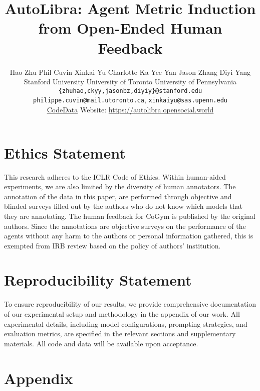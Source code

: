 \documentclass[11pt, a4paper]{googledeepmind}
\title{AutoLibra: Agent Metric Induction from Open-Ended Human Feedback}
\author{Hao Zhu\raisebox{0.5em}{\texttt{[image: figs/scale.png]}} Phil
Cuvin\raisebox{0.5em}{\texttt{[image: figs/microscope.png]}} Xinkai
Yu\raisebox{0.5em}{\texttt{[image: figs/ladder.png]}} Charlotte Ka Yee
Yan\raisebox{0.5em}{\texttt{[image: figs/scale.png]}} Jason Zhang\raisebox{0.5em}{\texttt{[image: figs/scale.png]}} Diyi Yang\raisebox{0.5em}{\texttt{[image: 
	figs/scale.png
]}}\\ \raisebox{0.5em}{\texttt{[image: figs/scale.png]}}Stanford
University \raisebox{0.5em}{\texttt{[image: figs/microscope.png]}}University
of Toronto \raisebox{0.5em}{\texttt{[image: figs/ladder.png]}}University
of Pennsylvania\\ \texttt{\{zhuhao,ckyy,jasonbz,diyiy\}@stanford.edu}\\ \texttt{philippe.cuvin@mail.utoronto.ca},
\texttt{xinkaiyu@sas.upenn.edu}\\ \href{https://github.com/Open-Social-World/autolibra}{Code}\quad\href{https://huggingface.co/datasets/open-social-world/autolibra}{Data}\quad
Website: \url{https://autolibra.opensocial.world}}
\begin{document}
	\maketitle
	\tableofcontents

	

	

	

	
	
	

	\section*{Ethics Statement}
	This research adheres to the ICLR Code of Ethics. Within human-aided experiments,
	we are also limited by the diversity of human annotators. The annotation of the
	data in this paper, are performed through objective and blinded surveys filled
	out by the authors who do not know which models that they are annotating. The human
	feedback for CoGym \citep{shao2024collaborative} is published by the original
	authors. Since the annotations are objective surveys on the performance of the
	agents without any harm to the authors or personal information gathered, this
	is exempted from IRB review based on the policy of authors' institution.
	\section*{Reproducibility Statement}
	To ensure reproducibility of our results, we provide comprehensive documentation
	of our experimental setup and methodology in the appendix of our work. All
	experimental details, including model configurations, prompting strategies, and
	evaluation metrics, are specified in the relevant sections and supplementary
	materials. All code and data will be available upon acceptance.



	
	

	\newpage
	\appendix
	\section*{Appendix}
	
\end{document}
